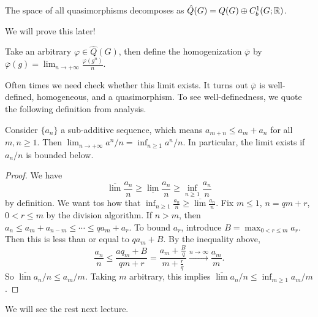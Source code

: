     \begin{prop}
        The space of all quasimorphisms decomposes as $\hat{Q}(G)=Q(G)\oplus C^1_b(G;\mathbb{R})$. 
    \end{prop}
    We will prove this later!
    \begin{definition}[Homogenization]
        Take an arbitrary $\varphi  \in \hat{Q}(G)$, then define the homogenization $\overline{\varphi }$ by $\overline{\varphi }(g)=\lim _{n \to +\infty}\frac{\varphi (g^n )}{n}$.
    \end{definition}
    Often times we need check whether this limit exists. It turns out $\overline{\varphi }$ is well-defined, homogeneous, and a quasimorphism. To see well-definedness, we quote the following definition from analysis.

    \begin{lemma}
        Consider $\{a_n \} $ a sub-additive sequence, which means $a_{m+n} \leq a_m+a_n $ for all $m,n \geq 1$. Then $\lim _{n \to +\infty}a^n  /n= \inf _{n\geq 1}a^n  / n$. In particular, the limit exists if  $a_n /n$ is bounded below.
    \end{lemma}
    \begin{proof}
       We have \[
       \overline{\lim} \frac{a_n}{n} \geq \underline{\lim} \frac{a_n }{n} \geq \inf _{n \geq 1} \frac{a_n }{n}
       \] by definition. We want tos how that $\inf _{n  \geq 1} \frac{a_n }{n}\geq \overline{\lim} \frac{a_n }{n}$. Fix $m \leq 1$, $n=qm+r$, $0 < r \leq m$ by the division algorithm. If $n>m$, then $a_n  \leq a_m+a_{n-m} \leq \cdots \leq q a_m+a_r$. To bound $a_r$, introduce $B=\max _{0 < r \leq m}a_r$. Then this is less than or equal to $qa_m+B$. By the inequality above, \[
       \frac{a_n }{n}\leq \frac{aq_m+B}{qm+r}= \frac{a_m + \frac{B}{q}}{m+ \frac{r}{q}} \xrightarrow{n \to \infty} \frac{a_m}{m}.
       \] So $\overline{\lim} a_n  / n \leq a_m / m$. Taking $m$ arbitrary, this implies $\overline{\lim} a_n  / n \leq \inf _{m \geq 1}a_m / m$.
    \end{proof}
    We will see the rest next lecture.
